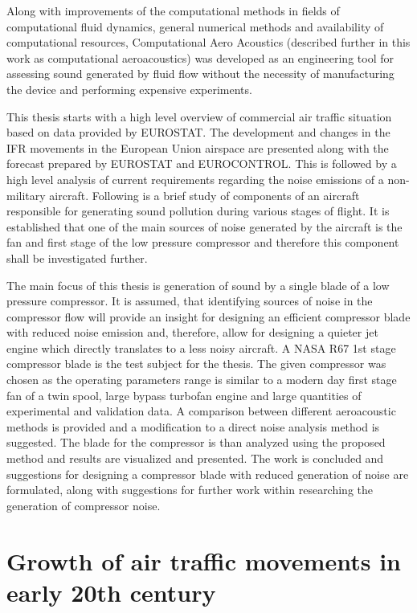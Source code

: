 Along with improvements of the computational methods in fields of computational fluid dynamics, general numerical methods and availability of computational resources, Computational Aero Acoustics (described further in this work as computational aeroacoustics) was developed as an engineering tool for assessing sound generated by fluid flow without the necessity of manufacturing the device and performing expensive experiments.

This thesis starts with a high level overview of commercial air traffic situation based on data provided by EUROSTAT. The development and changes in the IFR movements in the European Union airspace are presented along with the forecast prepared by EUROSTAT and EUROCONTROL. This is followed by a high level analysis of current requirements regarding the noise emissions of a non-military aircraft. Following is a brief study of components of an aircraft responsible for generating sound pollution during various stages of flight. It is established that one of the main sources of noise generated by the aircraft is the fan and first stage of the low pressure compressor and therefore this component shall be investigated further.

The main focus of this thesis is generation of sound by a single blade of a low pressure compressor. It is assumed, that identifying sources of noise in the compressor flow will provide an insight for designing an efficient compressor blade with reduced noise emission and, therefore, allow for designing a quieter jet engine which directly translates to a less noisy aircraft. A NASA R67 1st stage compressor blade is the test subject for the thesis. The given compressor was chosen as the operating parameters range is similar to a modern day first stage fan of a twin spool, large bypass turbofan engine and large quantities of experimental and validation data. A comparison between different aeroacoustic methods is provided and a modification to a direct noise analysis method is suggested. The blade for the compressor is than analyzed using the proposed method and results are visualized and presented. The work is concluded and suggestions for designing a compressor blade with reduced generation of noise are formulated, along with suggestions for further work within researching the generation of compressor noise. 

\section{Growth of air traffic movements in early 20th century}

